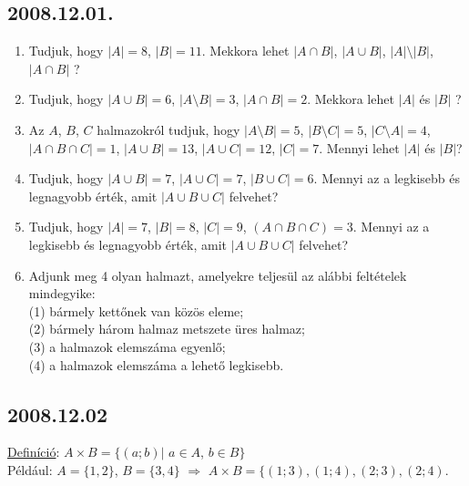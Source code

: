 \subsection*{2008.12.01.}
\begin{enumerate}
\item Tudjuk, hogy $|A|{=}8$, $|B|{=}11$. Mekkora 
lehet $|A{\cap}B|$, $|A{\cup}B|$, $|A|{\setminus}|B|$,
$|A{\cap}B|$ ?

\item Tudjuk, hogy $|A{\cup}B|{=}6$, $|A{\setminus}B|{=}3$,
$|A{\cap}B|{=}2$. Mekkora lehet $|A|$ és $|B|$ ?

\item Az $A$, $B$, $C$ halmazokról tudjuk, hogy $|A{\setminus}B|{=}5$, $|B{\setminus}C|{=}5$, $|C{\setminus}A|{=}4$, 
$|A{\cap}B{\cap}C|{=}1$, $|A{\cup}B|{=}13$, $|A{\cup}C|{=}12$, $|C|=7$.
 Mennyi lehet $|A|$ és $|B|$?

\item Tudjuk, hogy $|A{\cup}B|{=}7$, $|A{\cup}C|{=}7$, $|B{\cup}C|{=}6$.
 Mennyi az a legkisebb és legnagyobb érték, amit $|A{\cup}B{\cup}C|$ felvehet?

\item Tudjuk, hogy $|A|{=}7$, $|B|{=}8$, $|C|{=}9$, $(A{\cap}B{\cap}C){=}3$.
 Mennyi az a legkisebb és legnagyobb érték, amit $|A{\cup}B{\cup}C|$ felvehet?

\item Adjunk meg 4 olyan halmazt, amelyekre teljesül az alábbi feltételek mindegyike:
\\(1) bármely kettőnek van közös eleme;
\\(2) bármely három halmaz metszete üres halmaz;
\\(3) a halmazok elemszáma egyenlő;
\\(4) a halmazok elemszáma a lehető legkisebb.
\end{enumerate}

\subsection*{2008.12.02}
\underline{Definíció}: $A{\times}B{=}\{(a;b)|$ $a{\in}A$, $b{\in}B\}$ \\
Például: $A{=}\{1,2\}$, $B{=}\{3,4\}$ $\Rightarrow$ $A{\times}B{=}\{(1;3),(1;4),(2;3),(2;4)$.

